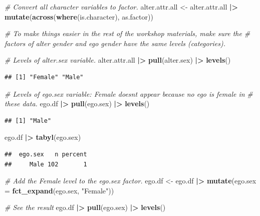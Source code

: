 \documentclass[
]{book}
\newenvironment{Shaded}{\begin{snugshade}}{\end{snugshade}}
\newcommand{\AttributeTok}[1]{\textcolor[rgb]{0.13,0.29,0.53}{#1}}
\newcommand{\CommentTok}[1]{\textcolor[rgb]{0.56,0.35,0.01}{\textit{#1}}}
\newcommand{\FunctionTok}[1]{\textcolor[rgb]{0.13,0.29,0.53}{\textbf{#1}}}
\newcommand{\NormalTok}[1]{#1}
\newcommand{\OtherTok}[1]{\textcolor[rgb]{0.56,0.35,0.01}{#1}}
\newcommand{\SpecialCharTok}[1]{\textcolor[rgb]{0.81,0.36,0.00}{\textbf{#1}}}
\newcommand{\StringTok}[1]{\textcolor[rgb]{0.31,0.60,0.02}{#1}}
\begin{document}
\begin{Shaded}
\begin{Highlighting}[]
\CommentTok{\# Convert all character variables to factor.}
\NormalTok{alter.attr.all }\OtherTok{\textless{}{-}}\NormalTok{ alter.attr.all }\SpecialCharTok{|\textgreater{}} 
  \FunctionTok{mutate}\NormalTok{(}\FunctionTok{across}\NormalTok{(}\FunctionTok{where}\NormalTok{(is.character), as.factor))}

\CommentTok{\# To make things easier in the rest of the workshop materials, make sure the }
\CommentTok{\# factors of alter gender and ego gender have the same levels (categories).}

\CommentTok{\# Levels of alter.sex variable.}
\NormalTok{alter.attr.all }\SpecialCharTok{|\textgreater{}}
  \FunctionTok{pull}\NormalTok{(alter.sex) }\SpecialCharTok{|\textgreater{}}
  \FunctionTok{levels}\NormalTok{()}
\end{Highlighting}
\end{Shaded}

\begin{verbatim}
## [1] "Female" "Male"
\end{verbatim}

\begin{Shaded}
\begin{Highlighting}[]
\CommentTok{\# Levels of ego.sex variable: Female doesn\textquotesingle{}t appear because no ego is female in }
\CommentTok{\# these data.}
\NormalTok{ego.df }\SpecialCharTok{|\textgreater{}}
  \FunctionTok{pull}\NormalTok{(ego.sex) }\SpecialCharTok{|\textgreater{}}
  \FunctionTok{levels}\NormalTok{()}
\end{Highlighting}
\end{Shaded}

\begin{verbatim}
## [1] "Male"
\end{verbatim}

\begin{Shaded}
\begin{Highlighting}[]
\NormalTok{ego.df }\SpecialCharTok{|\textgreater{}}
  \FunctionTok{tabyl}\NormalTok{(ego.sex)}
\end{Highlighting}
\end{Shaded}

\begin{verbatim}
##  ego.sex   n percent
##     Male 102       1
\end{verbatim}

\begin{Shaded}
\begin{Highlighting}[]
\CommentTok{\# Add the Female level to the ego.sex factor.}
\NormalTok{ego.df }\OtherTok{\textless{}{-}}\NormalTok{ ego.df }\SpecialCharTok{|\textgreater{}} 
  \FunctionTok{mutate}\NormalTok{(}\AttributeTok{ego.sex =} \FunctionTok{fct\_expand}\NormalTok{(ego.sex, }\StringTok{"Female"}\NormalTok{))}

\CommentTok{\# See the result}
\NormalTok{ego.df }\SpecialCharTok{|\textgreater{}}
  \FunctionTok{pull}\NormalTok{(ego.sex) }\SpecialCharTok{|\textgreater{}}
  \FunctionTok{levels}\NormalTok{()}
\end{Highlighting}
\end{Shaded}
\end{document}
